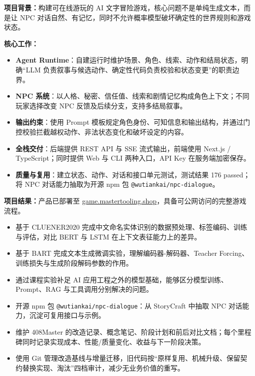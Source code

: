 
\textbf{项目背景：}构建可在线游玩的 AI 文字冒险游戏，核心问题不是单纯生成文本，而是让 NPC 对话自然、有记忆，同时不允许概率模型破坏确定性的世界规则和游戏状态。

\textbf{核心工作：}
\begin{itemize}[parsep=0.45ex]
  \item \textbf{Agent Runtime}：自建运行时维护场景、角色、线索、动作和结局状态，明确“LLM 负责叙事与候选动作、确定性代码负责校验和状态变更”的职责边界。
  \item \textbf{NPC 系统}：以人格、秘密、信任值、线索和剧情记忆构成角色上下文；不同玩家选择改变 NPC 反馈及后续分支，支持多结局叙事。
  \item \textbf{输出约束}：使用 Prompt 模板规定角色身份、可知信息和输出结构，并通过门控校验拦截越权动作、非法状态变化和破坏设定的内容。
  \item \textbf{全栈交付}：后端提供 REST API 与 SSE 流式输出，前端使用 Next.js / TypeScript；同时提供 Web 与 CLI 两种入口，API Key 在服务端加密保存。
  \item \textbf{质量与复用}：建立状态、动作、对话和接口单元测试，测试结果 176 passed；将 NPC 对话能力抽取为开源 npm 包 \texttt{@wutiankai/npc-dialogue}。
\end{itemize}

\textbf{项目结果：}产品已部署至 \href{https://game.mastertooling.shop}{game.mastertooling.shop}，具备可公网访问的完整游戏流程。

\begin{itemize}[parsep=0.45ex]
  \item 基于 CLUENER2020 完成中文命名实体识别的数据预处理、标签编码、训练与评估，对比 BERT 与 LSTM 在上下文表征能力上的差异。
  \item 基于 BART 完成文本生成微调实验，理解编码器-解码器、Teacher Forcing、训练损失与生成阶段解码参数的作用。
  \item 通过课程实验补足 AI 应用工程之外的模型基础，能够区分模型训练、Prompt、RAG 与工具调用分别解决的问题。
\end{itemize}

\begin{itemize}[parsep=0.45ex]
  \item 开源 npm 包 \texttt{@wutiankai/npc-dialogue}：从 StoryCraft 中抽取 NPC 对话能力，沉淀可复用接口与示例。
  \item 维护 408Master 的改造记录、概念笔记、阶段计划和前后对比文档；每个里程碑同时记录实现成本、性能/质量变化、收益与下一阶段决策。
  \item 使用 Git 管理改造基线与增量迁移，旧代码按“原样复用、机械升级、保留契约替换实现、淘汰”四档审计，减少无业务价值的重写。
\end{itemize}

